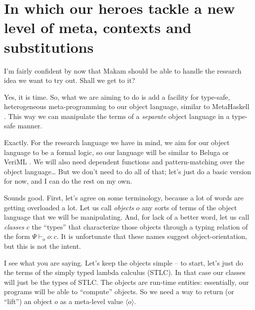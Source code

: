 \section{In which our heroes tackle a new level of meta, contexts and
substitutions}\label{in-which-our-heroes-tackle-a-new-level-of-meta-contexts-and-substitutions}

\heroSTUDENT{} I'm fairly confident by now that Makam should be able to handle
the research idea we want to try out. Shall we get to it?

\heroADVISOR{} Yes, it is time. So, what we are aiming to do is add a facility
for type-safe, heterogeneous meta-programming to our object language,
similar to MetaHaskell \citep{mainland2012explicitly}. This way we can
manipulate the terms of a \emph{separate} object language in a type-safe
manner.

\heroSTUDENT{} Exactly. For the research language we have in mind, we aim for
our object language to be a formal logic, so our language will be
similar to Beluga \citep{beluga-main-reference} or VeriML
\citep{veriml-main-reference}. We will also need dependent functions and
pattern-matching over the object language\ldots{} But we don't need to
do all of that; let's just do a basic version for now, and I can do the
rest on my own.

\newcommand\dep[1]{\ensuremath{#1}}
\newcommand\lift[1]{\ensuremath{\langle#1\rangle}}
\newcommand\odash[0]{\ensuremath{\vdash_{\text{o}}}}
\newcommand\wf[0]{\ensuremath{\; \text{wf}}}
\newcommand\aq[1]{\ensuremath{\texttt{aq}(#1)}}
\newcommand\aqopen[1]{\ensuremath{\texttt{aqopen}(#1)}}

\heroADVISOR{} Sounds good. First, let's agree on some terminology, because a
lot of words are getting overloaded a lot. Let us call \emph{objects}
\(o\) any sorts of terms of the object language that we will be
manipulating. And, for lack of a better word, let us call \emph{classes}
\(c\) the ``types'' that characterize those objects through a typing
relation of the form \(\Psi \odash o : c\). It is unfortunate that these
names suggest object-orientation, but this is not the intent.

\heroSTUDENT{} I see what you are saying. Let's keep the objects simple -- to
start, let's just do the terms of the simply typed lambda calculus
(STLC). In that case our classes will just be the types of STLC. The
objects are run-time entities: essentially, our programs will be able to
``compute'' objects. So we need a way to return (or ``lift'') an object
\(o\) as a meta-level value \(\lift{o}\).

